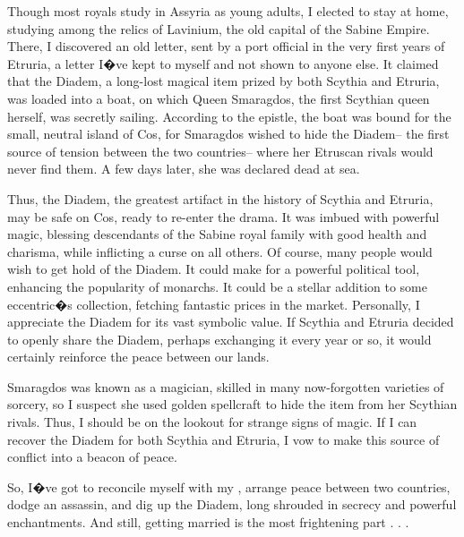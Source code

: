 \documentclass[char]{Kos}
\begin{document}
Though most royals study in Assyria as young adults, I elected to stay at home, studying among the relics of Lavinium, the old capital of the Sabine Empire. There, I discovered an old letter, sent by a port official in the very first years of Etruria, a letter I�ve kept to myself and not shown to anyone else. It claimed that the Diadem, a long-lost magical item prized by both Scythia and Etruria, was loaded into a boat, on which Queen Smaragdos, the first Scythian queen herself, was secretly sailing. According to the epistle, the boat was bound for the small, neutral island of Cos, for Smaragdos wished to hide the Diadem-- the first source of tension between the two countries-- where her Etruscan rivals would never find them. A few days later, she was declared dead at sea.

Thus, the Diadem, the greatest artifact in the history of Scythia and Etruria, may be safe on Cos, ready to re-enter the drama. It was imbued with powerful magic, blessing descendants of the Sabine royal family with good health and charisma, while inflicting a curse on all others. Of course, many people would wish to get hold of the Diadem. It could make for a powerful political tool, enhancing the popularity of monarchs. It could be a stellar addition to some eccentric�s collection, fetching fantastic prices in the market. Personally, I appreciate the Diadem for its vast symbolic value. If Scythia and Etruria decided to openly share the Diadem, perhaps exchanging it every year or so, it would certainly reinforce the peace between our lands.

Smaragdos was known as a magician, skilled in many now-forgotten varieties of sorcery, so I suspect she used golden spellcraft to hide the item from her Scythian rivals. Thus, I should be on the lookout for strange signs of magic. If I can recover the Diadem for both Scythia and Etruria, I vow to make this source of conflict into a beacon of peace. 

So, I�ve got to reconcile myself with my \cPoet{\sibling}, arrange peace between two countries, dodge an assassin, and dig up the Diadem, long shrouded in secrecy and powerful enchantments. And still, getting married is the most frightening part . . .
\end{document}
